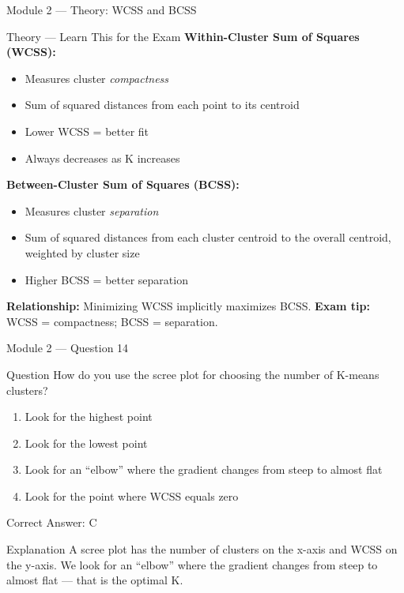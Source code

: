 \documentclass[aspectratio=169,10pt]{beamer}
\newcommand{\question}[1]{%
	\begin{block}{Question}
		#1
	\end{block}
}
\newcommand{\options}[4]{%
	\begin{enumerate}[label=\Alph*.,leftmargin=*]
		\item #1
		\item #2
		\item #3
		\item #4
	\end{enumerate}
}
\newcommand{\answerbox}[1]{%
	\begin{exampleblock}{Correct Answer: #1}
	\end{exampleblock}
}
\newcommand{\explain}[1]{%
	\begin{block}{Explanation}
		\small #1
	\end{block}
}
\newcommand{\theory}[1]{%
	\begin{block}{Theory --- Learn This for the Exam}
		\small #1
	\end{block}
}
\begin{document}
	\begin{frame}{Module 2 --- Theory: WCSS and BCSS}
		\theory{
			\textbf{Within-Cluster Sum of Squares (WCSS):}
			\begin{itemize}
				\item Measures cluster \emph{compactness}
				\item Sum of squared distances from each point to its centroid
				\item Lower WCSS = better fit
				\item Always decreases as K increases
			\end{itemize}
			\textbf{Between-Cluster Sum of Squares (BCSS):}
			\begin{itemize}
				\item Measures cluster \emph{separation}
				\item Sum of squared distances from each cluster centroid to the overall centroid, weighted by cluster size
				\item Higher BCSS = better separation
			\end{itemize}
			\textbf{Relationship:} Minimizing WCSS implicitly maximizes BCSS.
			\textbf{Exam tip:} WCSS = compactness; BCSS = separation.
		}
	\end{frame}
	
	\begin{frame}{Module 2 --- Question 14}
		\question{How do you use the scree plot for choosing the number of K-means clusters?}
		\options{Look for the highest point}{Look for the lowest point}{Look for an ``elbow'' where the gradient changes from steep to almost flat}{Look for the point where WCSS equals zero}
		\answerbox{C}
		\explain{A scree plot has the number of clusters on the x-axis and WCSS on the y-axis. We look for an ``elbow'' where the gradient changes from steep to almost flat --- that is the optimal K.}
	\end{frame}
	
\end{document}

